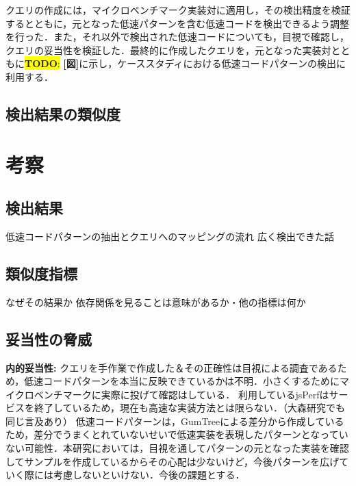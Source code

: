 \documentclass[submit,techrep,noauthor]{ipsj}
\newcommand{\todo}[1]{\colorbox{yellow}{{\bf TODO}:}{\color{red} {\textbf{[#1]}}}}
\begin{document}
クエリの作成には，マイクロベンチマーク実装対に適用し，その検出精度を検証するとともに，元となった低速パターンを含む低速コードを検出できるよう調整を行った．また，それ以外で検出された低速コードについても，目視で確認し，クエリの妥当性を検証した．最終的に作成したクエリを，元となった実装対とともに\todo{図}に示し，ケーススタディにおける低速コードパターンの検出に利用する．

\subsection{検出結果の類似度}




\section{考察}
\label{sec:discussion}



\subsection{検出結果}

低速コードパターンの抽出とクエリへのマッピングの流れ
広く検出できた話

\subsection{類似度指標}

なぜその結果か
依存関係を見ることは意味があるか・他の指標は何か

\subsection{妥当性の脅威}

\noindent\textbf{内的妥当性: }
クエリを手作業で作成した＆その正確性は目視による調査であるため，低速コードパターンを本当に反映できているかは不明．小さくするためにマイクロベンチマークに実際に投げて確認はしている．
利用しているjsPerfはサービスを終了しているため，現在も高速な実装方法とは限らない．（大森研究でも同じ言及あり）
低速コードパターンは，GumTreeによる差分から作成しているため，差分でうまくとれていないせいで低速実装を表現したパターンとなっていない可能性．本研究においては，目視を通してパターンの元となった実装を確認してサンプルを作成しているからその心配は少ないけど，今後パターンを広げていく際には考慮しないといけない．今後の課題とする．
\end{document}
